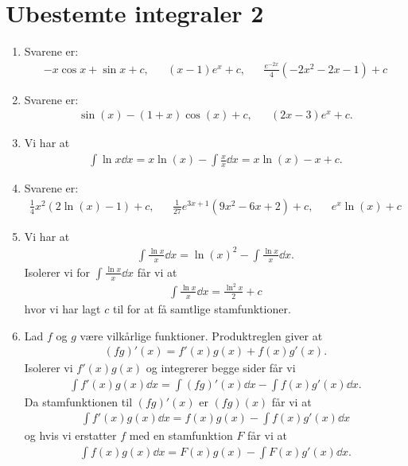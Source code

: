 \newpage
\section{Ubestemte integraler 2}

\begin{enumerate}
	\item \label{it:int21} Svarene er:
	\begin{align*}
	 -x\cos x+\sin x+c,&& (x-1)e^x+c,&&  \frac{e^{-2x}}{4}(-2x^2-2x-1)+c
	\end{align*}
	
	\item Svarene er:
	\begin{align*}
	\sin(x)-(1+x)\cos(x)+c,&& (2x-3)e^x+c.
	\end{align*}
	
	
	
	\item Vi har at
	\begin{align*}
	\int\ln x\dd x =x\ln(x)-\int \frac{x}{x}\dd x=x\ln (x)-x+c.
	\end{align*}
	
	\item\label{it:int23} Svarene er:
	\begin{align*}
	\frac{1}{4}x^2(2\ln(x)-1)+c,&& \frac{1}{27}e^{3x+1}(9x^2-6x+2)+c,&& e^x\ln(x)+c
	\end{align*}
	
	\item Vi har at
	\begin{align*}
	\int \frac{\ln x}{x} \dd x= \ln(x)^2-\int \frac{\ln x}{x}\dd x.
	\end{align*}
	Isolerer vi for $\int \frac{\ln x}{x}\dd x$ får vi at
	\begin{align*}
	\int \frac{\ln x}{x}\dd x=\frac{\ln^2 x}{2}+c
	\end{align*}
	hvor vi har lagt $c$ til for at få samtlige stamfunktioner.
	
	\item Lad $f$ og $g$ være vilkårlige funktioner. Produktreglen giver at
	\begin{align*}
	(fg)'(x)=f'(x)g(x)+f(x)g'(x).
	\end{align*}
	Isolerer vi $f'(x)g(x)$ og integrerer begge sider får vi
	\begin{align*}
	\int f'(x)g(x) \dd x=\int (fg)'(x)\dd x-\int f(x)g'(x)\dd x.
	\end{align*}
	Da stamfunktionen til $(fg)'(x)$ er $(fg)(x)$ får vi at
	\begin{align*}
	\int f'(x)g(x) \dd x=f(x)g(x)-\int f(x)g'(x)\dd x
	\end{align*}	
	og hvis vi erstatter $f$ med en stamfunktion $F$ får vi at 
	\begin{align*}
	\int f(x)g(x) \dd x=F(x)g(x)-\int F(x)g'(x)\dd x.
	\end{align*}
	

\end{enumerate}

